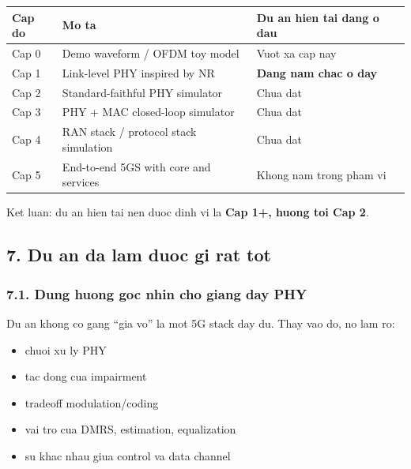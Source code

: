 \documentclass[
  vietnamese,
  a4paper,
  11pt]{article}
\newcounter{none} %
\providecommand{\tightlist}{%
  \setlength{\itemsep}{0pt}\setlength{\parskip}{0pt}}
\begin{document}
{\def\LTcaptype{none} %
\begin{longtable}[]{@{}
  >{\raggedright\arraybackslash}p{}
  >{\raggedright\arraybackslash}p{}
  >{\raggedright\arraybackslash}p{}@{}}
\toprule\noalign{}
\begin{minipage}[b]{\linewidth}\raggedright
Cap do
\end{minipage} & \begin{minipage}[b]{\linewidth}\raggedright
Mo ta
\end{minipage} & \begin{minipage}[b]{\linewidth}\raggedright
Du an hien tai dang o dau
\end{minipage} \\
\midrule\noalign{}
\endhead
\bottomrule\noalign{}
\endlastfoot
Cap 0 & Demo waveform / OFDM toy model & Vuot xa cap nay \\
Cap 1 & Link-level PHY inspired by NR & \textbf{Dang nam chac o day} \\
Cap 2 & Standard-faithful PHY simulator & Chua dat \\
Cap 3 & PHY + MAC closed-loop simulator & Chua dat \\
Cap 4 & RAN stack / protocol stack simulation & Chua dat \\
Cap 5 & End-to-end 5GS with core and services & Khong nam trong pham
vi \\
\end{longtable}
}

Ket luan: du an hien tai nen duoc dinh vi la \textbf{Cap 1+, huong toi
Cap 2}.

\subsection{7. Du an da lam duoc gi rat
tot}\label{du-an-da-lam-duoc-gi-rat-tot}

\subsubsection{7.1. Dung huong goc nhin cho giang day
PHY}\label{dung-huong-goc-nhin-cho-giang-day-phy}

Du an khong co gang ``gia vo'' la mot 5G stack day du. Thay vao do, no
lam ro:

\begin{itemize}
\tightlist
\item
  chuoi xu ly PHY
\item
  tac dong cua impairment
\item
  tradeoff modulation/coding
\item
  vai tro cua DMRS, estimation, equalization
\item
  su khac nhau giua control va data channel
\end{itemize}
\end{document}
